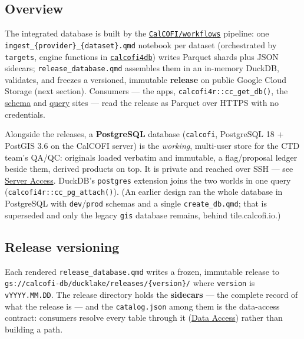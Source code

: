 \documentclass[
  letterpaper,
  DIV=11,
  numbers=noendperiod]{scrreprt}
\begin{document}
\subsection{Overview}\label{overview}

The integrated database is built by the
\href{https://github.com/CalCOFI/workflows}{\texttt{CalCOFI/workflows}}
pipeline: one \texttt{ingest\_\{provider\}\_\{dataset\}.qmd} notebook
per dataset (orchestrated by \texttt{targets}, engine functions in
\href{https://github.com/CalCOFI/calcofi4db}{\texttt{calcofi4db}})
writes Parquet shards plus JSON sidecars; \texttt{release\_database.qmd}
assembles them in an in-memory DuckDB, validates, and freezes a
versioned, immutable \textbf{release} on public Google Cloud Storage
(next section). Consumers --- the apps,
\texttt{calcofi4r::cc\_get\_db()}, the
\href{https://calcofi.io/db-schema/}{schema} and
\href{https://calcofi.io/db-query/}{query} sites --- read the release as
Parquet over HTTPS with no credentials.

Alongside the releases, a \textbf{PostgreSQL} database
(\texttt{calcofi}, PostgreSQL 18 + PostGIS 3.6 on the CalCOFI server) is
the \emph{working}, multi-user store for the CTD team's QA/QC: originals
loaded verbatim and immutable, a flag/proposal ledger beside them,
derived products on top. It is private and reached over SSH --- see
\href{server-access.qmd}{Server Access}. DuckDB's \texttt{postgres}
extension joins the two worlds in one query
(\texttt{calcofi4r::cc\_pg\_attach()}). (An earlier design ran the whole
database in PostgreSQL with \texttt{dev}/\texttt{prod} schemas and a
single \texttt{create\_db.qmd}; that is superseded and only the legacy
\texttt{gis} database remains, behind tile.calcofi.io.)

\subsection{Release versioning}\label{release-versioning}

Each rendered \texttt{release\_database.qmd} writes a frozen, immutable
release to \texttt{gs://calcofi-db/ducklake/releases/\{version\}/} where
\texttt{version} is \texttt{vYYYY.MM.DD}. The release directory holds
the \textbf{sidecars} --- the complete record of what the release is ---
and the \texttt{catalog.json} among them is the data-access contract:
consumers resolve every table through it
(\hyperref[where-the-data-lives]{Data Access}) rather than building a
path.
\end{document}
